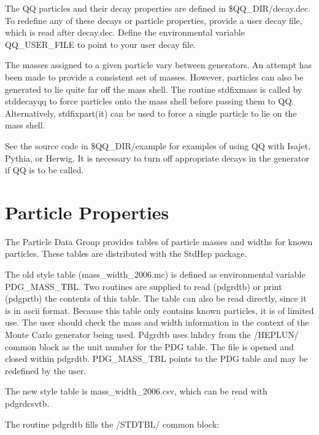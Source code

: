 The QQ particles and their decay properties are defined in \$QQ\_DIR/decay.dec.
To redefine any of these decays or particle properties, provide a user
decay file, which is read after decay.dec.  Define the environmental
variable QQ\_USER\_FILE to point to your user decay file.

The masses assigned to a given particle vary between generators.
An attempt has been made to provide a consistent set of masses.
However, particles can also be generated to lie quite far off the mass shell.
The routine stdfixmass is called by stddecayqq to force particles
onto the mass shell before passing them to QQ.  Alternatively,
stdfixpart(it) can be used to force a single particle to lie on 
the mass shell.

See the source code in \$QQ\_DIR/example for examples of using QQ with
Isajet, Pythia, or Herwig.  It is necessary to turn off appropriate decays in
the generator if QQ is to be called.

\section { Particle Properties }

The Particle Data Group provides tables of particle masses and widths 
for known particles.  
These tables are distributed with the StdHep package. 


The old style table (mass\_width\_2006.mc) is
defined as environmental variable PDG\_MASS\_TBL.
Two routines are supplied to read (pdgrdtb) or print (pdgprtb) the
contents of this table.  The table can also be read directly, since it
is in ascii format.  Because this table only contains known particles,
it is of limited use.  The user should check the mass and width information
in the context of the Monte Carlo generator being used.  Pdgrdtb uses
lnhdcy from the /HEPLUN/ common block as the unit number for the PDG table.
The file is opened and closed within pdgrdtb.  PDG\_MASS\_TBL points
to the PDG table and may be redefined by the user.

The new style table is mass\_width\_2006.csv, which can be read with pdgrdcsvtb.

\noindent The routine pdgrdtb fills the /STDTBL/ common block:

